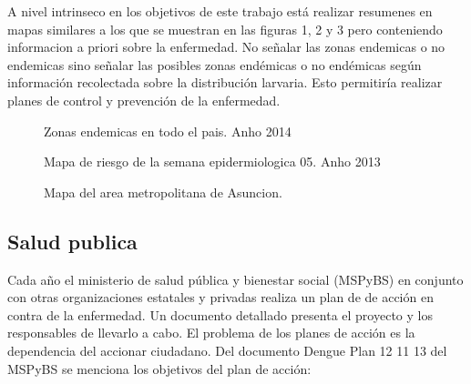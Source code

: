 A nivel intrinseco en los objetivos de este trabajo está realizar resumenes en mapas similares a los que se muestran en las figuras 1, 2 y 3 pero conteniendo informacion a priori sobre la enfermedad. No señalar las zonas endemicas o no endemicas sino señalar las posibles zonas endémicas o no endémicas según información recolectada sobre la distribución larvaria. Esto permitiría realizar planes de control y prevención de la enfermedad.\\

\begin{figure}
\centering
\caption{\label{fig:mapa1}Zonas endemicas en todo el pais. Anho 2014}
\end{figure}

\begin{figure}
\centering
\caption{\label{fig:mapa2}Mapa de riesgo de la semana epidermiologica 05. Anho 2013 }
\end{figure}

\begin{figure}
\centering
\caption{\label{fig:mapa3}Mapa del area metropolitana de Asuncion.}
\end{figure}

\subsection{Salud publica}
Cada año el ministerio de salud pública y bienestar social (MSPyBS) en conjunto con otras organizaciones estatales y privadas realiza un plan de de acción en contra de la enfermedad. Un documento detallado presenta el proyecto y los responsables de llevarlo a cabo. El problema de los planes de acción es la dependencia del accionar ciudadano.
Del documento Dengue Plan 12 11 13 del MSPyBS se menciona los objetivos del plan de acción: \\

